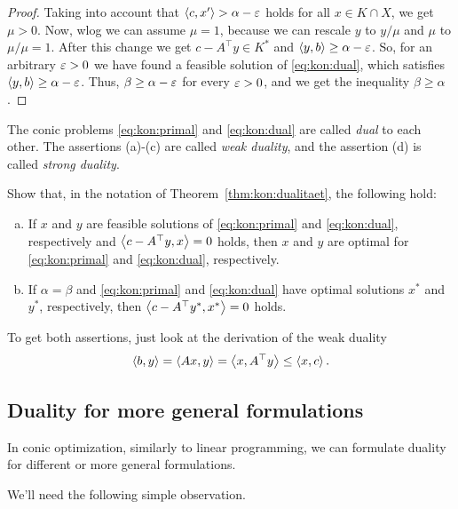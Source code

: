 \begin{proof}
	Taking into account that $\left\langle c , x' \right\rangle > \alpha - {\operatorname{\varepsilon}}$  holds for all $x \in K \cap X$, we get $\mu > 0$. Now, wlog we can assume $\mu=1$, because we can rescale $y$  to $y/\mu$ and $\mu$ to $\mu/\mu =1$. After this change we get $c - A^\top y \in K^\ast$ and $\left\langle y , b \right\rangle \ge \alpha - {\operatorname{\varepsilon}}$. So, for an arbitrary ${\operatorname{\varepsilon}}>0$ we have found a feasible solution of  \eqref{eq:kon:dual}, which satisfies $\left\langle y , b \right\rangle \ge \alpha - {\operatorname{\varepsilon}}$. Thus, $\beta \ge \alpha - {\operatorname{\varepsilon}}$ for every ${\operatorname{\varepsilon}}> 0$, and we get the inequality $\beta \ge \alpha$.
\end{proof}

The conic problems \eqref{eq:kon:primal} and \eqref{eq:kon:dual} are called \emph{dual} to each other. The assertions (a)-(c) are called \emph{weak duality}, and the assertion (d) is called \emph{strong duality}. 

\begin{exercise}
	\label{compl:slackness}
	Show that, in the notation of  Theorem~\ref{thm:kon:dualitaet}, the following hold: 
	\begin{enumerate}[(a)]
		\item If $x$ and $y$ are feasible solutions of \eqref{eq:kon:primal} and \eqref{eq:kon:dual}, respectively and $\left\langle c -A^\top y , x \right\rangle = 0$ holds, then $x$ and $y$ are optimal for \eqref{eq:kon:primal} and \eqref{eq:kon:dual}, respectively. 
		\item If $\alpha = \beta$ and \eqref{eq:kon:primal} and \eqref{eq:kon:dual} have optimal solutions $x^\ast$ and $y^\ast$, respectively, then $\left\langle c - A^\top y^\ast , x^\ast \right\rangle =0$ holds. 
	\end{enumerate}
\end{exercise}
\begin{solution}
	To get both assertions, just look at the derivation of the weak duality
	\[
		\left\langle b , y \right\rangle = \left\langle A x , y \right\rangle = \left\langle x , A^\top y \right\rangle \le \left\langle x , c \right\rangle.
	\]
\end{solution}

\subsection{Duality for more general formulations}

In conic optimization, similarly to linear programming, we can formulate duality for different or more general formulations. 

We'll need the following simple observation. 

